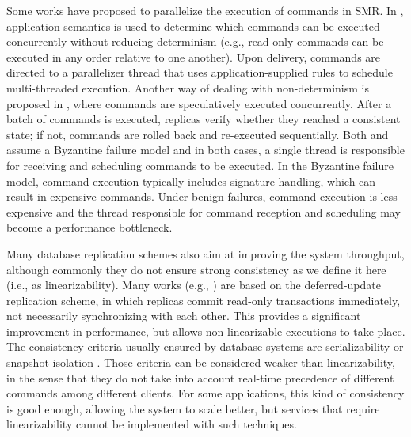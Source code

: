 \documentclass[11pt]{article}
\begin{document}
Some works have proposed to parallelize the execution of commands in SMR. 
In \cite{kotla2004htbft}, application semantics is used to determine which commands can be executed concurrently without reducing determinism (e.g., read-only commands can be executed in any order relative to one another). 
Upon delivery, commands are directed to a parallelizer thread that uses application-supplied rules to schedule multi-threaded execution. 
Another way of dealing with non-determinism is proposed in \cite{kapritsos2012eve}, where commands are speculatively executed concurrently.
After a batch of commands is executed, replicas verify whether they reached a consistent state; if not, commands are rolled back and re-executed sequentially. 
Both \cite{kotla2004htbft} and \cite{kapritsos2012eve} assume a Byzantine failure model and in both cases, a single thread is responsible for receiving and scheduling commands to be executed. 
In the Byzantine failure model, command execution typically includes signature handling, which can result in expensive commands.
Under benign failures, command execution is less expensive and the thread responsible for command reception and scheduling may become a performance bottleneck.

Many database replication schemes also aim at improving the system throughput, although commonly they do not ensure strong consistency as we define it here (i.e., as linearizability). Many works (e.g., \cite{chundi96dur, kobus2013hybrid, sciascia2012sdur, SousaOMP01}) are based on the deferred-update replication scheme, in which replicas commit read-only transactions immediately, not necessarily synchronizing with each other. This provides a significant improvement in performance, but allows non-linearizable executions to take place. The consistency criteria usually ensured by database systems are serializability \cite{BHG87} or snapshot isolation \cite{LinKJPA09}. Those criteria can be considered weaker than linearizability, in the sense that they do not take into account real-time precedence of different commands among different clients. For some applications, this kind of consistency is good enough, allowing the system to scale better, but services that require linearizability cannot be implemented with such techniques.
\end{document}
